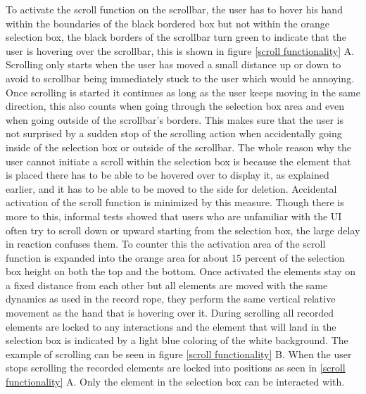 To activate the scroll function on the scrollbar, the user has to hover his hand within the boundaries of the black bordered box but not within the orange selection box, the black borders of the scrollbar turn green to indicate that the user is hovering over the scrollbar, this is shown in figure \ref{scroll functionality} A. Scrolling only starts when the user has moved a small distance up or down to avoid to scrollbar being immediately stuck to the user which would be annoying. Once scrolling is started it continues as long as the user keeps moving in the same direction, this also counts when going through the selection box area and even when going outside of the scrollbar's borders. This makes sure that the user is not surprised by a sudden stop of the scrolling action when accidentally going inside of the selection box or outside of the scrollbar. The whole reason why the user cannot initiate a scroll within the selection box is because the element that is placed there has to be able to be hovered over to display it, as explained earlier, and it has to be able to be moved to the side for deletion. Accidental activation of the scroll function is minimized by this measure. Though there is more to this, informal tests showed that users who are unfamiliar with the UI often try to scroll down or upward starting from the selection box, the large delay in reaction confuses them. To counter this the activation area of the scroll function is expanded into the orange area for about 15 percent of the selection box height on both the top and the bottom. Once activated the elements stay on a fixed distance from each other but all elements are moved with the same dynamics as used in the record rope, they perform the same vertical relative movement as the hand that is hovering over it. During scrolling all recorded elements are locked to any interactions and the element that will land in the selection box is indicated by a light blue coloring of the white background. The example of scrolling can be seen in figure \ref{scroll functionality} B. When the user stops scrolling the recorded elements are locked into positions as seen in \ref{scroll functionality} A. Only the element in the selection box can be interacted with.\\

